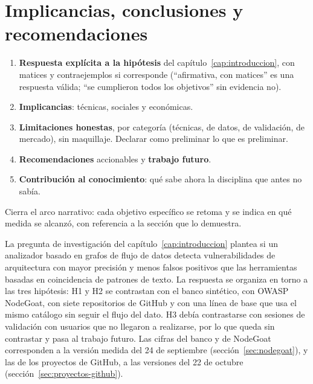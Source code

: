 
\chapter{Implicancias, conclusiones y recomendaciones}\label{cap:conclusiones}

\begin{guia}
\begin{enumerate}
    \item \textbf{Respuesta explícita a la hipótesis} del
          capítulo~\ref{cap:introduccion}, con matices y contraejemplos
          si corresponde (``afirmativa, con matices'' es una respuesta
          válida; ``se cumplieron todos los objetivos'' sin evidencia no).
    \item \textbf{Implicancias}: técnicas, sociales y económicas.
    \item \textbf{Limitaciones honestas}, por categoría (técnicas, de datos,
          de validación, de mercado), sin maquillaje. Declarar como
          preliminar lo que es preliminar.
    \item \textbf{Recomendaciones} accionables y \textbf{trabajo futuro}.
    \item \textbf{Contribución al conocimiento}: qué sabe ahora la disciplina
          que antes no sabía.
\end{enumerate}
Cierra el arco narrativo: cada objetivo específico se retoma y se
indica en qué medida se alcanzó, con referencia a la sección que lo
demuestra.
\end{guia}


La pregunta de investigación del capítulo~\ref{cap:introduccion} plantea
si un analizador basado en grafos de flujo de datos detecta
vulnerabilidades de arquitectura con mayor precisión y menos falsos
positivos que las herramientas basadas en coincidencia de patrones de
texto. La respuesta se organiza en torno a las tres hipótesis: H1 y H2
se contrastan con el banco sintético, con OWASP NodeGoat, con siete
repositorios de GitHub y con una línea de base que usa el mismo catálogo sin
seguir el flujo del dato. H3 debía contrastarse con sesiones de validación con usuarios que no llegaron a realizarse, por lo que queda sin contrastar y pasa al trabajo futuro. Las cifras
del banco y de NodeGoat corresponden a la versión medida del 24 de
septiembre (sección~\ref{sec:nodegoat}), y las de los proyectos de
GitHub, a las versiones del 22 de octubre
(sección~\ref{sec:proyectos-github}).

